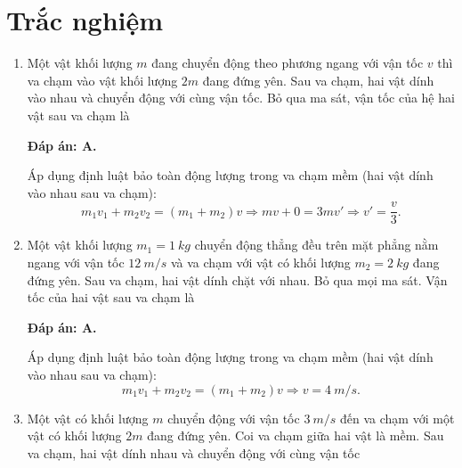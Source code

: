 \section{Trắc nghiệm}
\begin{enumerate}[label=\bfseries Câu \arabic*:]
	\item {}
	
	
	{
			Một vật khối lượng $m$ đang chuyển động theo phương ngang với vận tốc $v$ thì va chạm vào vật khối lượng $2m$ đang đứng yên. Sau va chạm, hai vật dính vào nhau và chuyển động với cùng vận tốc. Bỏ qua ma sát, vận tốc của hệ hai vật sau va chạm là
	}
	
	\hideall
	{	
		\textbf{Đáp án: A.}
		
		Áp dụng định luật bảo toàn động lượng trong va chạm mềm (hai vật dính vào nhau sau va chạm):
		$$m_1v_1 + m_2 v_2 = (m_1 + m_2) v \Rightarrow m v + 0 = 3m v' \Rightarrow v'=\dfrac{v}{3}.$$
	}
	\item {}
	
	
	{
		Một vật khối lượng $m_1=\SI{1}{kg}$ chuyển động thẳng đều trên mặt phẳng nằm ngang với vận tốc $\SI{12}{m/s}$ và va chạm với vật có khối lượng $m_2=\SI{2}{kg}$ đang đứng yên. Sau va chạm, hai vật dính chặt với nhau. Bỏ qua mọi ma sát. Vận tốc của hai vật sau va chạm là
	}
	
	\hideall
	{	
		\textbf{Đáp án: A.}
		
		Áp dụng định luật bảo toàn động lượng trong va chạm mềm (hai vật dính vào nhau sau va chạm):
		$$m_1v_1 + m_2 v_2 = (m_1 + m_2) v \Rightarrow v=\SI{4}{m/s}.$$
	}
		\item {}
	
	
	{Một vật có khối lượng $m$ chuyển động với vận tốc $\SI{3}{m/s}$ đến va chạm với một vật có khối lượng  $2m$ đang đứng yên. Coi va chạm giữa hai vật là mềm. Sau va chạm, hai vật dính nhau và chuyển động với cùng vận tốc 
	
}
\end{enumerate}
